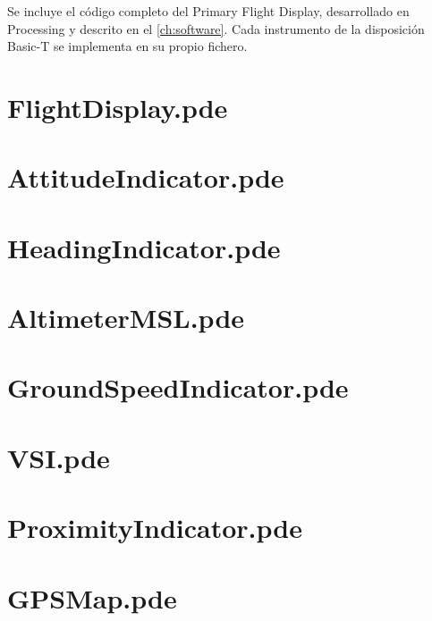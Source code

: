 Se incluye el código completo del Primary Flight Display, desarrollado en
Processing y descrito en el \cref{ch:software}. Cada instrumento de la disposición
Basic-T se implementa en su propio fichero.

\section{FlightDisplay.pde}


\section{AttitudeIndicator.pde}


\section{HeadingIndicator.pde}


\section{AltimeterMSL.pde}


\section{GroundSpeedIndicator.pde}


\section{VSI.pde}


\section{ProximityIndicator.pde}


\section{GPSMap.pde}
